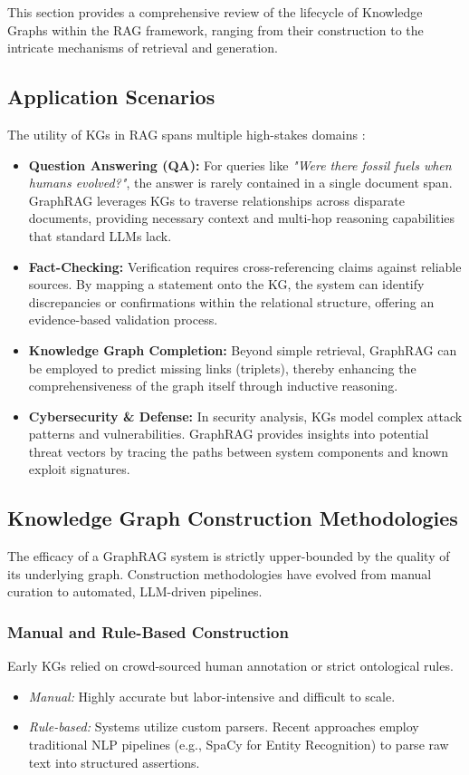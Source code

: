 \documentclass[a4paper, 12pt]{extreport}
\begin{document}
This section provides a comprehensive review of the lifecycle of Knowledge Graphs within the RAG framework, ranging from their construction to the intricate mechanisms of retrieval and generation.

\subsection{Application Scenarios}
The utility of KGs in RAG spans multiple high-stakes domains \cite{graphrag2025}:
\begin{itemize}
    \item \textbf{Question Answering (QA):} For queries like \textit{"Were there fossil fuels when humans evolved?"}, the answer is rarely contained in a single document span. GraphRAG leverages KGs to traverse relationships across disparate documents, providing necessary context and multi-hop reasoning capabilities that standard LLMs lack.
    \item \textbf{Fact-Checking:} Verification requires cross-referencing claims against reliable sources. By mapping a statement onto the KG, the system can identify discrepancies or confirmations within the relational structure, offering an evidence-based validation process.
    \item \textbf{Knowledge Graph Completion:} Beyond simple retrieval, GraphRAG can be employed to predict missing links (triplets), thereby enhancing the comprehensiveness of the graph itself through inductive reasoning.
    \item \textbf{Cybersecurity \& Defense:} In security analysis, KGs model complex attack patterns and vulnerabilities. GraphRAG provides insights into potential threat vectors by tracing the paths between system components and known exploit signatures.
\end{itemize}

\subsection{Knowledge Graph Construction Methodologies}
The efficacy of a GraphRAG system is strictly upper-bounded by the quality of its underlying graph. Construction methodologies have evolved from manual curation to automated, LLM-driven pipelines.

\subsubsection{Manual and Rule-Based Construction}
Early KGs relied on crowd-sourced human annotation or strict ontological rules.
\begin{itemize}
    \item[] \textit{Manual:} Highly accurate but labor-intensive and difficult to scale.
    \item[] \textit{Rule-based:} Systems utilize custom parsers. Recent approaches employ traditional NLP pipelines (e.g., SpaCy for Entity Recognition) to parse raw text into structured assertions.
\end{itemize}
\end{document}
